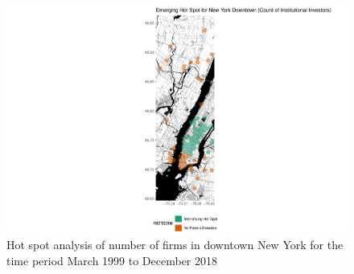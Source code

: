 \begin{figure}
	\centering
	\includegraphics[width=1\linewidth]{Figures/ChapterIV/NY_Count_EH_Downtown}
	\caption[Hot Spot Analysis of Number of Firms in Downtown New York 1999-2018]{Hot spot analysis of number of firms in downtown New York for the time period March 1999 to December 2018}
	\label{fig:NYCcounthotspot_Downtown}
\end{figure}

